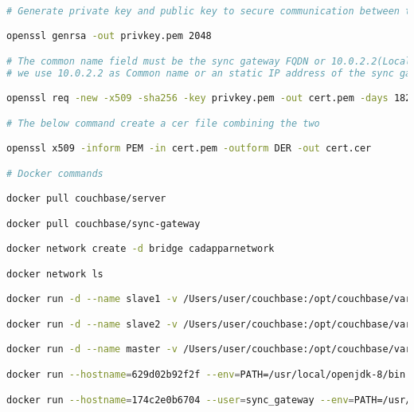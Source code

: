 \documentclass[a4paper,12pt,twoside,french]{book}
[a4paper,12pt,twoside]
\begin{document}
\begin{lstlisting}[language=bash, caption=Commandes Docker]

# Generate private key and public key to secure communication between the synchronization server and the mobile clients

openssl genrsa -out privkey.pem 2048

# The common name field must be the sync gateway FQDN or 10.0.2.2(Localhost) our a static IP adress for the sync gateway server
# we use 10.0.2.2 as Common name or an static IP address of the sync gateway server 

openssl req -new -x509 -sha256 -key privkey.pem -out cert.pem -days 1825

# The below command create a cer file combining the two

openssl x509 -inform PEM -in cert.pem -outform DER -out cert.cer

# Docker commands

docker pull couchbase/server 

docker pull couchbase/sync-gateway 

docker network create -d bridge cadapparnetwork

docker network ls 

docker run -d --name slave1 -v /Users/user/couchbase:/opt/couchbase/var --network cadapparnetwork couchbase/server

docker run -d --name slave2 -v /Users/user/couchbase:/opt/couchbase/var --network cadapparnetwork couchbase/server

docker run -d --name master -v /Users/user/couchbase:/opt/couchbase/var --network cadapparnetwork -p 8091:8091 —p 8092:8092 -p 8093:8093 -p 8094:8094 -p 8095:8095 -p 8096:8096 -p 11210:11210 —p 11211:11211 -p 18097:18097 -p 18096:18096 -p 18095:18095 -p 18094:18094 -p 18093:18093 -p 18092:18092 -p 18091:18091 -p 11280:11280 -p 11207:11207 couchbase/server

docker run --hostname=629d02b92f2f --env=PATH=/usr/local/openjdk-8/bin:/usr/local/sbin:/usr/local/bin:/usr/sbin:/usr/bin:/sbin:/bin --env=JAVA_HOME=/usr/local/openjdk-8 --env=LANG=C.UTF-8 --env=JAVA_VERSION=8u342 --network=bridge -p 9000:9000 -p 9443:9443 --restart=no --runtime=runc -d cadappar-server:latest

docker run --hostname=174c2e0b6704 --user=sync_gateway --env=PATH=/usr/local/sbin:/usr/local/bin:/usr/sbin:/usr/bin:/sbin:/bin:/opt/couchbase-sync-gateway/bin --volume=/Users/user/Documents/doctorat/Services/sync-gateway-config.json:/etc/sync_gateway/sync_gateway.json --volume=/Users/user/Documents/doctorat/Services/cert.pem:/etc/sync_gateway/ssl/cert.pem --volume=/Users/user/Documents/doctorat/Services/privkey.pem:/etc/sync_gateway/ssl/privkey.pem --volume=/var/log/sync_gateway --network=cadapparnetwork --workdir=/home/sync_gateway -p 4984:4984 -p 4985:4985 --restart=no --label='maintainer=docker@couchbase.com' --label='org.opencontainers.image.ref.name=ubuntu' --label='org.opencontainers.image.version=22.04' --runtime=runc -d couchbase/sync-gateway


\end{lstlisting}
\end{document}
